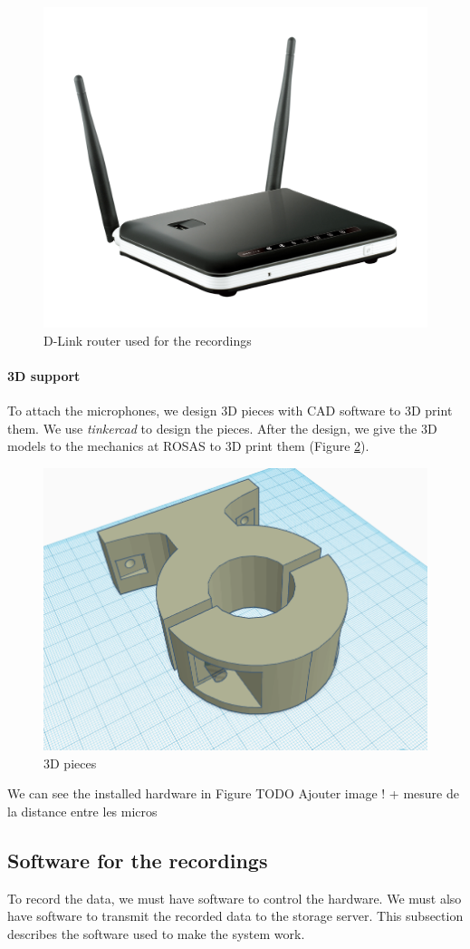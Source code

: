 \begin{figure}[H]
    \centering
    \includegraphics[width=.5\textwidth]{images/4g_lte_router.png}
    \caption{D-Link router used for the recordings}
    \label{fig:4g_lte_router}
\end{figure}

\paragraph{3D support}

To attach the microphones, we design 3D pieces with CAD software to 3D print them. We use \textit{tinkercad} to design the pieces. After the design, we give the 3D models to the mechanics at ROSAS to 3D print them (Figure \ref{fig:3d_pieces}).

\begin{figure}[H]
    \centering
    \includegraphics[width=.5\textwidth]{../Images/tinkercad_mic_support.png}
    \caption{3D pieces}
    \label{fig:3d_pieces}
\end{figure}

We can see the installed hardware in Figure TODO Ajouter image ! + mesure de la distance entre les micros

\subsection{Software for the recordings}

To record the data, we must have software to control the hardware. We must also have software to transmit the recorded data to the storage server. This subsection describes the software used to make the system work.

